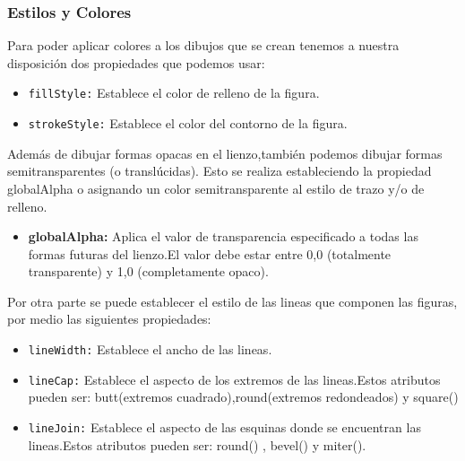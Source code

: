 \subsubsection*{Estilos y Colores}
Para poder aplicar colores a los dibujos que se crean tenemos a nuestra disposición dos propiedades que podemos usar:
\begin{itemize}
\item \texttt{fillStyle:} Establece el color de relleno de la figura.
\item \texttt{strokeStyle:} Establece el color del contorno de la figura.
\end{itemize}
Además de dibujar formas opacas en el lienzo,también podemos dibujar formas semitransparentes (o translúcidas). Esto se realiza  estableciendo la propiedad globalAlpha o asignando un color semitransparente al estilo de trazo y/o de relleno.
\begin{itemize}
\item \textbf{globalAlpha:} Aplica el valor de transparencia especificado a todas las formas futuras del lienzo.El valor debe estar entre 0,0 (totalmente transparente) y 1,0 (completamente opaco).
\end{itemize}
Por otra parte se puede establecer el estilo de las lineas que componen las figuras, por medio las siguientes propiedades:
\begin{itemize}
\item \texttt{lineWidth:} Establece el ancho de las lineas.
\item \texttt{lineCap:} Establece el aspecto de los extremos de las lineas.Estos atributos pueden ser: butt(extremos cuadrado),round(extremos redondeados) y square()
\item \texttt{lineJoin:} Establece el aspecto de las esquinas donde se encuentran las lineas.Estos atributos pueden ser: round() , bevel() y miter().
\end{itemize}
